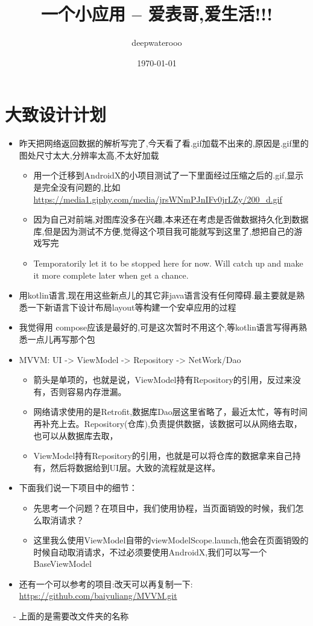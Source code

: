 \documentclass[9pt, b5paper]{article}
\author{deepwaterooo}
\date{\today}
\title{一个小应用 -- 爱表哥,爱生活!!!}
\begin{document}
\maketitle
\tableofcontents


\section{大致设计计划}
\label{sec-1}
\begin{itemize}
\item 昨天把网络返回数据的解析写完了,今天看了看.gif加载不出来的,原因是.gif里的图处尺寸太大,分辨率太高,不太好加载
\begin{itemize}
\item 用一个迁移到AndroidX的小项目测试了一下里面经过压缩之后的.gif,显示是完全没有问题的,比如 \url{https://media1.giphy.com/media/jrsWNmPJnIFv0jrLZy/200_d.gif}
\item 因为自己对前端,对图库没多在兴趣,本来还在考虑是否做数据持久化到数据库,但是因为测试不方便,觉得这个项目我可能就写到这里了,想把自己的游戏写完
\item Temporatorily let it to be stopped here for now. Will catch up and make it more complete later when get a chance.
\end{itemize}
\item 用kotlin语言,现在用这些新点儿的其它非java语言没有任何障碍.最主要就是熟悉一下新语言下设计布局layout等构建一个安卓应用的过程
\item 我觉得用 compose应该是最好的,可是这次暂时不用这个,等kotlin语言写得再熟悉一点儿再写那个包
\item MVVM: UI -> ViewModel -> Repository -> NetWork/Dao
\begin{itemize}
\item 箭头是单项的，也就是说，ViewModel持有Repository的引用，反过来没有，否则容易内存泄漏。
\item 网络请求使用的是Retrofit,数据库Dao层这里省略了，最近太忙，等有时间再补充上去。Repository(仓库),负责提供数据，该数据可以从网络去取，也可以从数据库去取，
\item ViewModel持有Repository的引用，也就是可以将仓库的数据拿来自己持有，然后将数据给到UI层。大致的流程就是这样。
\end{itemize}
\item 下面我们说一下项目中的细节：
\begin{itemize}
\item 先思考一个问题？在项目中，我们使用协程，当页面销毁的时候，我们怎么取消请求？
\item 这里我么使用ViewModel自带的viewModelScope.launch,他会在页面销毁的时候自动取消请求，不过必须要使用AndroidX,我们可以写一个BaseViewModel
\end{itemize}
\item 还有一个可以参考的项目:改天可以再复制一下:　\url{https://github.com/baiyuliang/MVVM.git}
\end{itemize}
　- 上面的是需要改文件夹的名称
\end{document}
